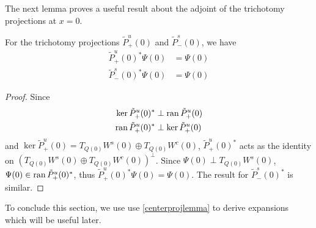 \documentclass[thesis.tex]{subfiles}
\begin{document}
The next lemma proves a useful result about the adjoint of the trichotomy projections at $x = 0$.

\begin{lemma}\label{lemma:trichadjoint}
For the trichotomy projections $\tilde{P}_+^u(0)$ and $\tilde{P}_-^s(0)$, we have
\begin{equation}
\begin{aligned}
\tilde{P}_+^u(0)^* \Psi(0) &= \Psi(0) \\
\tilde{P}_-^s(0)^* \Psi(0) &= \Psi(0)
\end{aligned}
\end{equation}
\begin{proof}
Since
\begin{align*}
\mathop\mathrm{ker}\nolimits \tilde{P}_+^u(0)^* &\perp \operatorname{ran} \tilde{P}_+^u(0) \\
\operatorname{ran} \tilde{P}_+^u(0)^* &\perp \mathop\mathrm{ker}\nolimits \tilde{P}_+^u(0)
\end{align*}
and $\ker \tilde{P}_+^u(0) = T_{Q(0)} W^s(0) \oplus T_{Q(0)} W^c(0)$, $\tilde{P}_+^u(0)^*$ acts as the identity on $(T_{Q(0)} W^s(0) \oplus T_{Q(0)} W^c(0))^\perp$. Since $\Psi(0) \perp T_{Q(0)} W^s(0)$, $\Psi(0) \in \operatorname{ran} \tilde{P}_+^u(0)^*$, thus $\tilde{P}_+^u(0)^* \Psi(0) = \Psi(0)$. The result for $\tilde{P}_-^s(0)^*$ is similar.
\end{proof}
\end{lemma}

To conclude this section, we use use \cref{centerprojlemma} to derive expansions which will be useful later.
\end{document}
